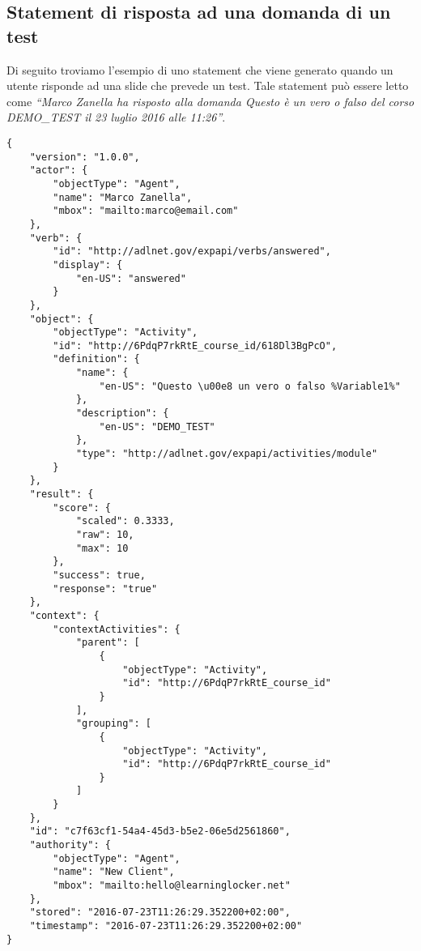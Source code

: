     \subsection{Statement di risposta ad una domanda di un test}
    Di seguito troviamo l'esempio di uno statement che viene generato quando un utente risponde ad una slide che prevede un test. Tale statement può essere letto come \textit{``Marco Zanella ha risposto alla domanda Questo è un vero o falso del corso DEMO\_TEST il 23 luglio 2016 alle 11:26''}.
\begin{lstlisting}
{
    "version": "1.0.0",
    "actor": {
        "objectType": "Agent",
        "name": "Marco Zanella",
        "mbox": "mailto:marco@email.com"
    },
    "verb": {
        "id": "http://adlnet.gov/expapi/verbs/answered",
        "display": {
            "en-US": "answered"
        }
    },
    "object": {
        "objectType": "Activity",
        "id": "http://6PdqP7rkRtE_course_id/618Dl3BgPcO",
        "definition": {
            "name": {
                "en-US": "Questo \u00e8 un vero o falso %Variable1%"
            },
            "description": {
                "en-US": "DEMO_TEST"
            },
            "type": "http://adlnet.gov/expapi/activities/module"
        }
    },
    "result": {
        "score": {
            "scaled": 0.3333,
            "raw": 10,
            "max": 10
        },
        "success": true,
        "response": "true"
    },
    "context": {
        "contextActivities": {
            "parent": [
                {
                    "objectType": "Activity",
                    "id": "http://6PdqP7rkRtE_course_id"
                }
            ],
            "grouping": [
                {
                    "objectType": "Activity",
                    "id": "http://6PdqP7rkRtE_course_id"
                }
            ]
        }
    },
    "id": "c7f63cf1-54a4-45d3-b5e2-06e5d2561860",
    "authority": {
        "objectType": "Agent",
        "name": "New Client",
        "mbox": "mailto:hello@learninglocker.net"
    },
    "stored": "2016-07-23T11:26:29.352200+02:00",
    "timestamp": "2016-07-23T11:26:29.352200+02:00"
}
\end{lstlisting}

